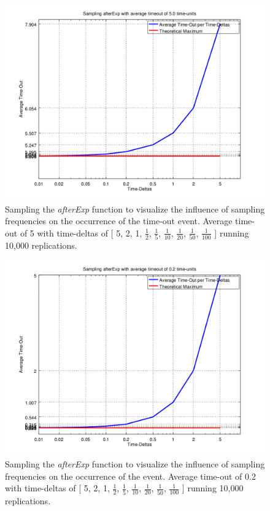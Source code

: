 \begin{figure}
	\centering
	\includegraphics[width=.6\textwidth, angle=0]{./../shared/fig/samplingTest_afterExp_5time.png}
	\caption{Sampling the \textit{afterExp} function to visualize the influence of sampling frequencies on the occurrence of the time-out event. Average time-out of 5 with time-deltas of [ 5, 2, 1, $\frac{1}{2}$, $\frac{1}{5}$, $\frac{1}{10}$, $\frac{1}{20}$, $\frac{1}{50}$, $\frac{1}{100}$ ] running 10,000 replications.}
	\label{fig:sampling_afterExp_5time}
\end{figure}

\begin{figure}
	\centering
	\includegraphics[width=.6\textwidth, angle=0]{./../shared/fig/samplingTest_afterExp_02time.png}
	\caption{Sampling the \textit{afterExp} function to visualize the influence of sampling frequencies on the occurrence of the event. Average time-out of 0.2 with time-deltas of [ 5, 2, 1, $\frac{1}{2}$, $\frac{1}{5}$, $\frac{1}{10}$, $\frac{1}{20}$, $\frac{1}{50}$, $\frac{1}{100}$ ] running 10,000 replications.}
	\label{fig:sampling_afterExp_02time}
\end{figure}

